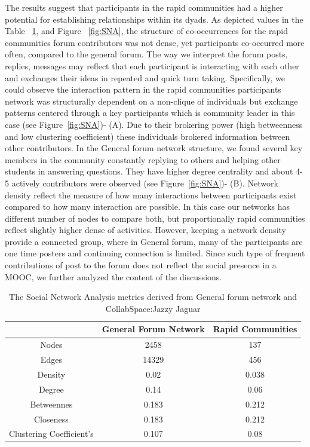 \documentclass[manuscript,screen,review]{acmart}
\begin{document}
The results suggest that participants in the rapid communities had a higher potential for establishing relationships within its dyads. As depicted values in the Table ~\ref{tab:SNATab}, and Figure ~\ref{fig:SNA}, the structure of co-occurrences for the rapid communities forum contributors was not dense, yet participants co-occurred more often, compared to the general forum. The way we interpret the forum posts, replies, messages may reflect that each participant is interacting with each other and exchanges their ideas in repeated and quick turn taking. Specifically, we could observe the interaction pattern in the rapid communities participants network was structurally dependent on a non-clique of individuals but exchange patterns centered through a key participants which is community leader in this case (see Figure~\ref{fig:SNA})- (A). Due to their brokering power (high betweenness and low clustering coefficient) these individuals brokered information between other contributors. In the General forum network structure, we found several key members in the community constantly replying to others and helping other students in answering questions. They have higher degree centrality and about 4-5 actively contributors were observed (see Figure~\ref{fig:SNA})- (B). Network density reflect the measure of how many interactions between participants exist compared to how many interaction are possible. In this case our networks has different number of nodes to compare both, but proportionally rapid communities reflect slightly higher dense of activities. However, keeping a network density provide a connected group, where in General forum, many of the participants are one time posters and continuing connection is limited. Since such type of frequent contributions of post to the forum does not reflect the social presence in a MOOC, we further analyzed the content of the discussions. 

\begin{table}[h!]
\caption{The Social Network Analysis metrics derived from General forum network and CollabSpace:Jazzy Jaguar}
\label{tab:SNATab}
    \begin{tabular}{c|c|c}
    \toprule
     & General Forum Network  & Rapid Communities   \\
     \midrule
     Nodes	& 2458 & 137    \\
     Edges & 14329 & 456   \\
     Density & 0.02 & 0.038  \\
     Degree & 0.14 & 0.06   \\ 
    Betweennes & 0.183 & 0.212 \\ 
    Closeness & 0.183 & 0.212  \\
    Clustering 
    Coefficient's & 0.107 & 0.08 \\
    \bottomrule
    \end{tabular}
    \end{table}
\end{document}
